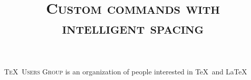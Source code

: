 \documentclass{article}
\title{\huge \scshape Custom commands with intelligent spacing}
\newcommand{\TUG}{\textsc{\TeX\ Users Group}\xspace}
\begin{document}
\maketitle

\TUG is an organization of people interested in \TeX\ and \LaTeX\
	
\end{document}
